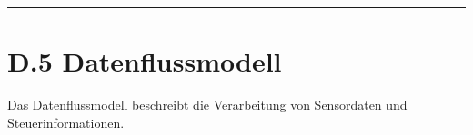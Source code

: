 \documentclass[
  a4paper,
  12pt,
  DIV=12,        %
  parskip=half,  %
  headings=small %
]{scrartcl}
\theoremstyle{definition}
\theoremstyle{definition}
\newenvironment{Shaded}{\begin{snugshade}}{\end{snugshade}}
\begin{document}


\begin{center}\rule{0.5\linewidth}{0.5pt}\end{center}

\section{D.5 Datenflussmodell}\label{d.5-datenflussmodell}

Das Datenflussmodell beschreibt die Verarbeitung von Sensordaten und
Steuerinformationen.

\end{document}

